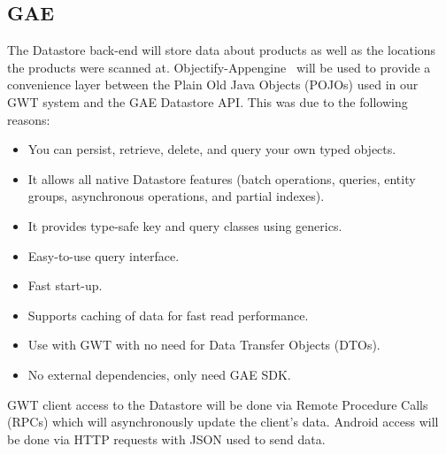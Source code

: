 \subsection{GAE}

The Datastore back-end will store data about products as well as the locations the products were scanned at. 
Objectify-Appengine~\cite{ofy} will be used to provide a convenience layer between the Plain Old Java Objects (POJOs) used in our GWT system and the GAE Datastore API. This was due to the following reasons:
\begin{itemize}
\item You can persist, retrieve, delete, and query your own typed objects.
\item It allows all native Datastore features (batch operations, queries, entity groups, asynchronous operations, and partial indexes).
\item It provides type-safe key and query classes using generics.
\item Easy-to-use query interface.
\item Fast start-up.
\item Supports caching of data for fast read performance.
\item Use with GWT with no need for Data Transfer Objects (DTOs).
\item No external dependencies, only need GAE SDK.
\end{itemize}
GWT client access to the Datastore will be done via Remote Procedure Calls (RPCs) which will asynchronously update the client's data. Android access will be done via HTTP requests with JSON used to send data. 

